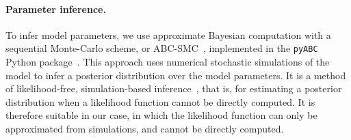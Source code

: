 \documentclass[12pt]{extarticle}
\let\vec\mathbf
\newcommand{\likelihood}{\mathcal{L}}
\begin{document}

\paragraph{Parameter inference.} To infer model parameters, we use approximate Bayesian computation with a sequential Monte-Carlo scheme, or ABC-SMC~\citep{Sisson2009}, implemented in the \texttt{pyABC} Python package~\citep[\href{https://pyabc.readthedocs.io}{pyabc.readthedocs.io}]{Klinger2018}.
This approach uses numerical stochastic simulations of the model to infer a posterior distribution over the model parameters. It is a method of likelihood-free, simulation-based inference~\citep{Cranmer2020}, that is, for estimating a posterior distribution when a likelihood function cannot be directly computed. It is therefore suitable in our case, in which the likelihood function can only be approximated from simulations, and cannot be directly computed. 
\end{document}

